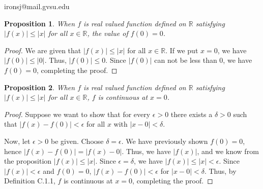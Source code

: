 \documentclass[11 pt]{article}
\newtheorem{proposition}{Proposition}
\newcommand{\newpar}{\vspace{.15in}\noindent}
\begin{document}
\noindent ironsj@mail.gvsu.edu
\newpar
\begin{proposition}
When $f$ is real valued function defined on $\mathbb{R}$ satisfying $\lvert f(x)\rvert\le\lvert x\rvert$ for all $x\in\mathbb{R}$, the value of $f(0)=0$.

\end{proposition}
\begin{proof}
We are given that $\lvert f(x)\rvert\le\lvert x\rvert$ for all $x\in\mathbb{R}$. If we put $x=0$, we have $\lvert f(0)\rvert\le\lvert 0\rvert$. Thus, $\lvert f(0)\rvert\le0$. Since $\lvert f(0)\rvert$ can not be less than 0, we have $f(0)=0$, completing the proof. 

\end{proof}

\newpar
\begin{proposition}
When $f$ is real valued function defined on $\mathbb{R}$ satisfying $\lvert f(x)\rvert\le\lvert x\rvert$ for all $x\in\mathbb{R}$, $f$ is continuous at $x=0$.

\end{proposition}
\begin{proof}
Suppose we want to show that for every $\epsilon>0$ there exists a $\delta>0$ such that $\mid f(x)-f(0)\mid<\epsilon$ for all $x$ with $\mid x-0\mid<\delta$. 

\newpar
Now, let $\epsilon>0$ be given. Choose $\delta=\epsilon$. We have previously shown $f(0)=0$, hence $\lvert f(x)-f(0)\rvert=\lvert f(x)-0\rvert$. Thus, we have $\lvert f(x)\rvert$, and we know from the proposition $\lvert f(x)\rvert\le\lvert x\rvert$. Since $\epsilon=\delta$, we have $\lvert f(x)\rvert\le\lvert x\rvert<\epsilon$. Since $\lvert f(x)\rvert<\epsilon$ and $f(0)=0$, $\lvert f(x)-f(0)\rvert<\epsilon$ for $\lvert x-0\rvert<\delta$. Thus, by Definition C.1.1, $f$ is continuous at $x=0$, completing the proof.
\end{proof}
\end{document}
